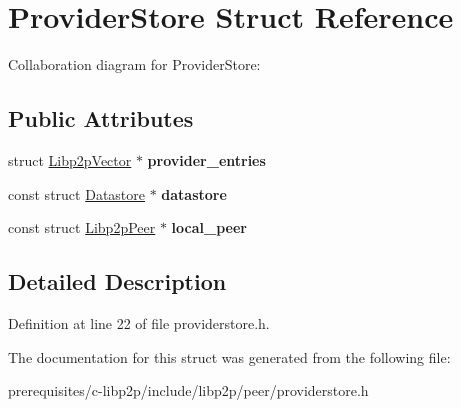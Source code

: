 \hypertarget{struct_provider_store}{}\section{Provider\+Store Struct Reference}
\label{struct_provider_store}


Collaboration diagram for Provider\+Store\+:
\subsection*{Public Attributes}
\begin{DoxyCompactItemize}
\item 
\mbox{\label{struct_provider_store_ae385725574f7430f096e2bbb573443c0}} 
struct \mbox{\hyperlink{struct_libp2p_vector}{Libp2p\+Vector}} $\ast$ {\bfseries provider\+\_\+entries}
\item 
\mbox{\label{struct_provider_store_ad06750127294d086bf1f7fd0cf23bc7e}} 
const struct \mbox{\hyperlink{struct_datastore}{Datastore}} $\ast$ {\bfseries datastore}
\item 
\mbox{\label{struct_provider_store_ac204a1c7372dd3db6a0c83a86576ffd5}} 
const struct \mbox{\hyperlink{struct_libp2p_peer}{Libp2p\+Peer}} $\ast$ {\bfseries local\+\_\+peer}
\end{DoxyCompactItemize}


\subsection{Detailed Description}


Definition at line 22 of file providerstore.\+h.



The documentation for this struct was generated from the following file\+:\begin{DoxyCompactItemize}
\item 
prerequisites/c-\/libp2p/include/libp2p/peer/providerstore.\+h\end{DoxyCompactItemize}
